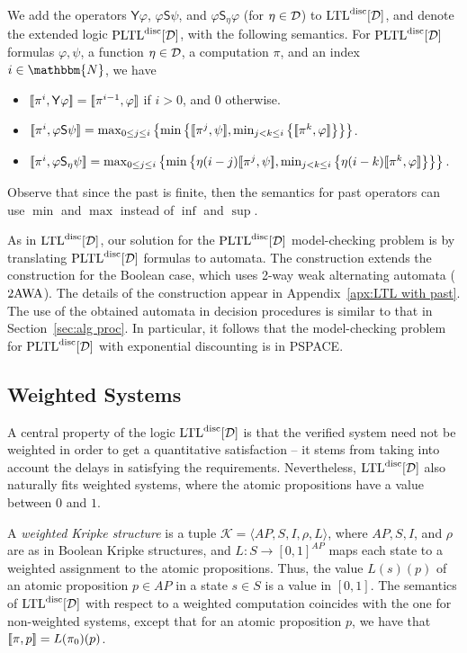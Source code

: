 \documentclass{llncs}
\newcommand{\set}[1]{{\left\{#1\right\}}}
\newcommand{\Nat}{\mathbbm{N}}
\newcommand{\zug}[1]{\langle #1  \rangle}
\newcommand{\LTL}{{\ensuremath{\rm LTL}}\xspace}
\newcommand{\PLTL}{{\ensuremath{\rm PLTL}}\xspace}
\newcommand{\Yest}{\mathsf{Y}}
\newcommand{\Since}{\mathsf{S}}
\newcommand{\K}{{\mathcal K}}
\newcommand{\twAWW}{\mbox{\rm 2AWA}\xspace}
\newcommand{\D}{{\cal D}}
\renewcommand{\phi}{\varphi}
\newcommand{\DLTL}{\ensuremath{\LTL^{\text{disc}}[\D]}}
\newcommand{\LTLD}{\DLTL}
\newcommand{\DPLTL}{\ensuremath{\PLTL^{\text{disc}}[\D]}}
\newcommand{\df}{\eta}
\begin{document}
We add the operators $\Yest \phi$, $\phi \Since \psi$, and $\phi \Since_\df \phi$ (for $\df\in \D$) to $\DLTL$, and denote the extended logic $\DPLTL$, with the following semantics. For $\DPLTL$ formulas $\phi, \psi$, a function $\df\in \D$, a computation $\pi$, and an index $i\in \Nat$, we have
\begin{itemize}
\item $\sem{\pi^i,\Yest \phi}=\sem{\pi^{i-1},\phi}$ if $i>0$, and $0$ otherwise.
\item $\sem{\pi^i,\phi \Since \psi}=\max_{0\le j\le i}\set{\min\set{\sem{\pi^j,\psi},\min_{j<k\le i}\set{\sem{\pi^k,\phi}}}}$.
\item $\sem{\pi^i,\phi \Since_\df \psi}=
\max_{0\le j\le i}\set{\min\set{\df(i-j)\sem{\pi^j,\psi},\min_{j<k\le i}\set{\df(i-k)\sem{\pi^k,\phi}}}}$.
\end{itemize}
Observe that since the past is finite, then the semantics for past operators can use $\min$ and $\max$ instead of $\inf$ and $\sup$. 

As in $\DLTL$, our solution for the $\DPLTL$ model-checking problem is by translating $\DPLTL$ formulas to automata. The construction extends the construction for the Boolean case, which uses 2-way weak alternating automata ($\twAWW$). The details of the construction appear in Appendix~\ref{apx:LTL with past}. The use of the obtained automata in decision procedures is similar to that in Section~\ref{sec:alg proc}. In particular, it follows that the model-checking problem for $\DPLTL$ with exponential discounting is in PSPACE.


\subsection{Weighted Systems}
\label{wsys}
A central property of the logic $\LTLD$ is that the verified system need not be weighted in order to get a quantitative satisfaction -- it stems from taking into account the delays in satisfying the requirements. Nevertheless, $\LTLD$  also naturally fits weighted systems, where the atomic propositions have a value between $0$ and $1$.


A {\em weighted Kripke structure} is a tuple $\K=\zug{AP,S,I,\rho,L}$, where $AP, S, I$, and $\rho$ are as in Boolean Kripke structures, and $L:S\to [0,1]^{AP}$ maps each state to a weighted assignment to the atomic propositions. Thus, the value $L(s)(p)$ of an atomic proposition $p \in AP$ in a state $s \in S$ is a value in $[0,1]$. The semantics of $\DLTL$ with respect to a weighted computation coincides with the one for non-weighted systems, except that for an atomic proposition $p$, we have that $[\![\pi, p]\!]=L(\pi_0)(p)$.
\end{document}

